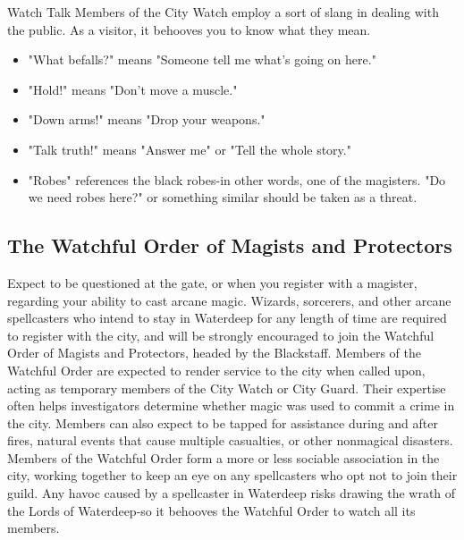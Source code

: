 \documentclass[10pt,a4paper,twoside,twocolumn,openany,nodeprecatedcode]{dndbook}
\begin{document}
\begin{DndComment}{Watch Talk}
Members of the City Watch employ a sort of slang in dealing with the public. As a visitor, it behooves you to know what they mean.
\begin{itemize}

\item "What befalls?" means "Someone tell me what's going on here."
\item "Hold!" means "Don't move a muscle."
\item "Down arms!" means "Drop your weapons."
\item "Talk truth!" means "Answer me" or "Tell the whole story."
\item "Robes" references the black robes-in other words, one of the magisters. "Do we need robes here?" or something similar should be taken as a threat.
\end{itemize}


\end{DndComment}

\subsection{The Watchful Order of Magists and Protectors}
Expect to be questioned at the gate, or when you register with a magister, regarding your ability to cast arcane magic. Wizards, sorcerers, and other arcane spellcasters who intend to stay in Waterdeep for any length of time are required to register with the city, and will be strongly encouraged to join the Watchful Order of Magists and Protectors, headed by the Blackstaff.
Members of the Watchful Order are expected to render service to the city when called upon, acting as temporary members of the City Watch or City Guard. Their expertise often helps investigators determine whether magic was used to commit a crime in the city. Members can also expect to be tapped for assistance during and after fires, natural events that cause multiple casualties, or other nonmagical disasters.
Members of the Watchful Order form a more or less sociable association in the city, working together to keep an eye on any spellcasters who opt not to join their guild. Any havoc caused by a spellcaster in Waterdeep risks drawing the wrath of the Lords of Waterdeep-so it behooves the Watchful Order to watch all its members.
\end{document}
